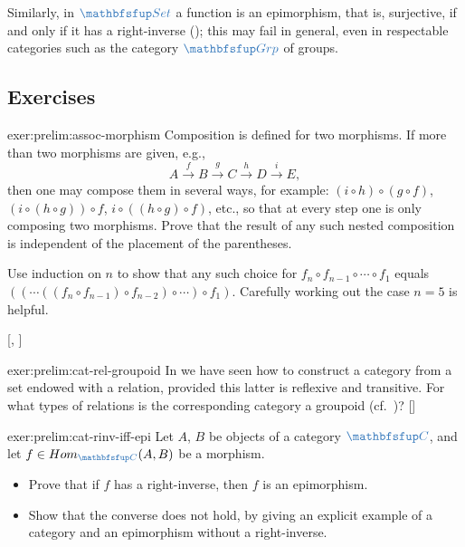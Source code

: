 Similarly, in $\categ{Set}$ a function is an epimorphism, that is,
surjective, if and only if it has a right-inverse
(); this may fail in general, even in
respectable categories such as the category $\categ{Grp}$ of groups.

\subsection*{Exercises}

\begin{exer}{\exerused}{exer:prelim:assoc-morphism}
  Composition is defined for two morphisms. If more than two morphisms
  are given, e.g.,
  \[
    A \xrightarrow{f} B \xrightarrow{g} C \xrightarrow{h} D
    \xrightarrow{i} E,
  \]
  then one may compose them in several ways, for example:
  $(i \circ h) \circ (g \circ f)$, $(i \circ (h \circ g)) \circ f$,
  $i \circ ((h \circ g) \circ f)$, etc., so that at every step one is
  only composing two morphisms. Prove that the result of any such
  nested composition is independent of the placement of the
  parentheses.

\begin{hint}
  Use induction on $n$ to show that any such choice for
  $f_n \circ f_{n-1} \circ \cdots \circ f_1$ equals
  $((\cdots((f_n \circ f_{n-1}) \circ f_{n-2}) \circ \cdots) \circ
  f_1)$. Carefully working out the case $n = 5$ is helpful.
\end{hint} [,
]
\end{exer}

\begin{exer}{\exerused}{exer:prelim:cat-rel-groupoid}
  In  we have seen how to construct a
  category from a set endowed with a relation, provided this latter is
  reflexive and transitive. For what types of relations is the
  corresponding category a groupoid (cf.\
  )?
  []
\end{exer}

\begin{exer}{}{exer:prelim:cat-rinv-iff-epi}
  Let $A$, $B$ be objects of a category $\categ{C}$, and let
  $f \in \Hom_{\categ{C}}(A,B)$ be a morphism.
  \begin{itemize}
  \item Prove that if $f$ has a right-inverse, then $f$ is an
    epimorphism.
  \item Show that the converse does not hold, by giving an explicit
    example of a category and an epimorphism without a right-inverse.
  \end{itemize}
\end{exer}

